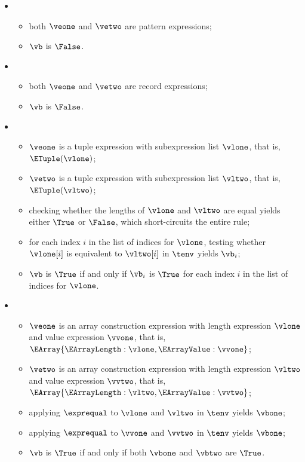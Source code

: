 \begin{itemize}
  \item {}
  \begin{itemize}
    \item both $\veone$ and $\vetwo$ are pattern expressions;
    \item $\vb$ is $\False$.
  \end{itemize}

  \item {}
  \begin{itemize}
    \item both $\veone$ and $\vetwo$ are record expressions;
    \item $\vb$ is $\False$.
  \end{itemize}

  \item {}
  \begin{itemize}
    \item $\veone$ is a tuple expression with subexpression list $\vlone$,
          that is, $\ETuple(\vlone)$;
    \item $\vetwo$ is a tuple expression with subexpression list $\vltwo$,
          that is, $\ETuple(\vltwo)$;
    \item checking whether the lengths of $\vlone$ and $\vltwo$ are equal yields either $\True$ or $\False$, which short-circuits
          the entire rule;
    \item for each index $i$ in the list of indices for $\vlone$, testing whether $\vlone[i]$ is equivalent to $\vltwo[i]$
          in $\tenv$ yields $\vb_i$\ProseOrTypeError;
    \item $\vb$ is $\True$ if and only if $\vb_i$ is $\True$ for each index $i$ in the list of indices for $\vlone$.
  \end{itemize}

  \item {}
  \begin{itemize}
    \item $\veone$ is an array construction expression with length expression $\vlone$ and value expression $\vvone$,
          that is, $\EArray\{\EArrayLength: \vlone, \EArrayValue: \vvone\}$;
    \item $\vetwo$ is an array construction expression with length expression $\vltwo$ and value expression $\vvtwo$,
          that is, $\EArray\{\EArrayLength: \vltwo, \EArrayValue: \vvtwo\}$;
    \item applying $\exprequal$ to $\vlone$ and $\vltwo$ in $\tenv$ yields $\vbone$\ProseOrTypeError;
    \item applying $\exprequal$ to $\vvone$ and $\vvtwo$ in $\tenv$ yields $\vbone$\ProseOrTypeError;
    \item $\vb$ is $\True$ if and only if both $\vbone$ and $\vbtwo$ are $\True$.
  \end{itemize}


\end{itemize}
